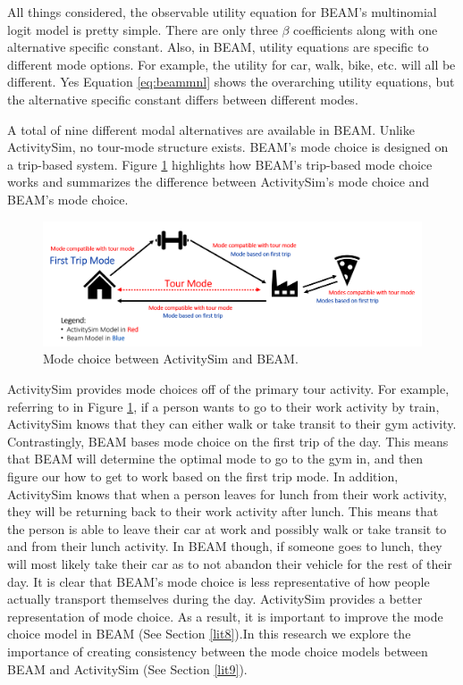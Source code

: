 \documentclass[12pt, oneside, openright]{byuthesis}
\begin{document}
All things considered, the observable utility equation for BEAM's multinomial logit model is pretty simple. There are only three \(\beta\) coefficients along with one alternative specific constant. Also, in BEAM, utility equations are specific to different mode options. For example, the utility for car, walk, bike, etc. will all be different. Yes Equation \eqref{eq:beammnl} shows the overarching utility equations, but the alternative specific constant differs between different modes.

A total of nine different modal alternatives are available in BEAM. Unlike ActivitySim, no tour-mode structure exists. BEAM's mode choice is designed on a trip-based system. Figure \ref{fig:fig-mode-compare} highlights how BEAM's trip-based mode choice works and summarizes the difference between ActivitySim's mode choice and BEAM's mode choice.

\begin{figure}

{\centering \includegraphics[width=1\linewidth]{pics/asim-beam-compare} 

}

\caption{Mode choice between ActivitySim and BEAM.}\label{fig:fig-mode-compare}
\end{figure}

ActivitySim provides mode choices off of the primary tour activity. For example, referring to in Figure \ref{fig:fig-mode-compare}, if a person wants to go to their work activity by train, ActivitySim knows that they can either walk or take transit to their gym activity. Contrastingly, BEAM bases mode choice on the first trip of the day. This means that BEAM will determine the optimal mode to go to the gym in, and then figure our how to get to work based on the first trip mode. In addition, ActivitySim knows that when a person leaves for lunch from their work activity, they will be returning back to their work activity after lunch. This means that the person is able to leave their car at work and possibly walk or take transit to and from their lunch activity. In BEAM though, if someone goes to lunch, they will most likely take their car as to not abandon their vehicle for the rest of their day. It is clear that BEAM's mode choice is less representative of how people actually transport themselves during the day. ActivitySim provides a better representation of mode choice. As a result, it is important to improve the mode choice model in BEAM (See Section \ref{lit8}).In this research we explore the importance of creating consistency between the mode choice models between BEAM and ActivitySim (See Section \ref{lit9}).
\end{document}
